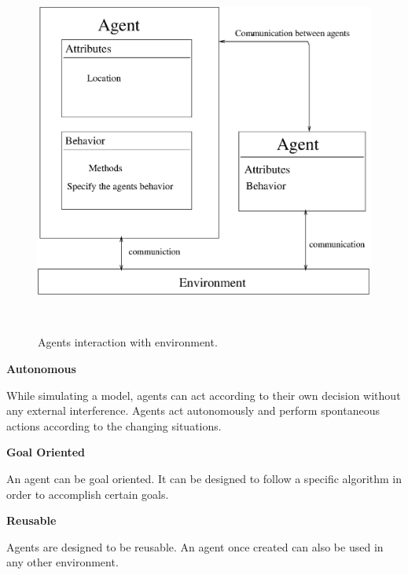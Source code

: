 \begin{figure}[H]
\vspace{12mm}
\centering
\includegraphics[height=4.8in, width=5.1in]{agent.eps}
\caption{Agents interaction with environment.}
\label{fig:3.1}
\vspace{10mm}
\end{figure} 

\vspace{0.5cm}
\noindent\textbf{Autonomous}
\vspace{5mm}

\noindent While simulating a model, agents can act according to their own decision without any external interference. Agents act autonomously and perform spontaneous actions according to the changing situations. 

\vspace{0.5cm}
\noindent\textbf{Goal Oriented}
\vspace{5mm}

\noindent An agent can be goal oriented. It can be designed to follow a specific algorithm in order to accomplish certain goals.

\vspace{0.5cm}
\noindent\textbf{Reusable}
\vspace{5mm}

\noindent Agents are designed to be reusable. An agent once created can also be used in any other environment.

